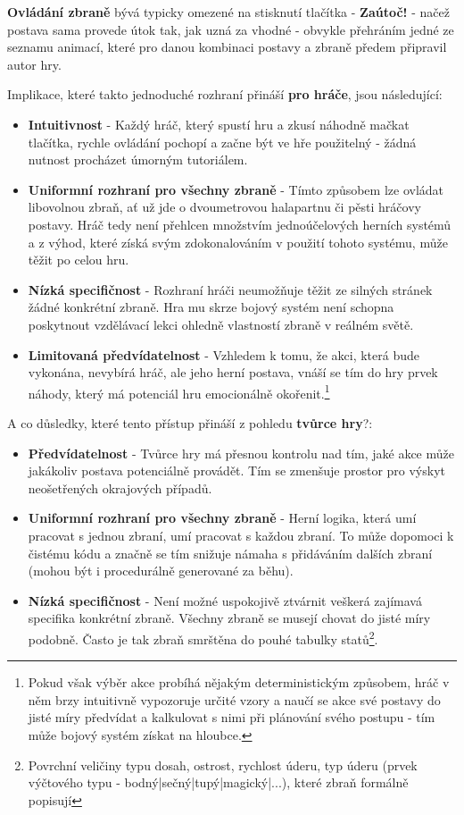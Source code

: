 \textbf{Ovládání zbraně} bývá typicky omezené na stisknutí tlačítka - \textbf{Zaútoč!} - načež postava sama provede útok tak, jak uzná za vhodné - obvykle přehráním jedné ze seznamu animací, které pro danou kombinaci postavy a zbraně předem připravil autor hry.

Implikace, které takto jednoduché rozhraní přináší \textbf{pro hráče}, jsou následující:
\begin{itemize}
    \item \textbf{Intuitivnost} - Každý hráč, který spustí hru a zkusí náhodně mačkat tlačítka, rychle ovládání pochopí a začne být ve hře použitelný - žádná nutnost procházet úmorným tutoriálem.
    \item \textbf{Uniformní rozhraní pro všechny zbraně} - Tímto způsobem lze ovládat libovolnou zbraň, ať už jde o dvoumetrovou halapartnu či pěsti hráčovy postavy. Hráč tedy není přehlcen množstvím jednoúčelových herních systémů a z výhod, které získá svým zdokonalováním v použití tohoto systému, může těžit po celou hru.
    \item \textbf{Nízká specifičnost} - Rozhraní hráči neumožňuje těžit ze silných stránek žádné konkrétní zbraně. Hra mu skrze bojový systém není schopna poskytnout vzdělávací lekci ohledně vlastností zbraně v reálném světě.
    \item \textbf{Limitovaná předvídatelnost} - Vzhledem k tomu, že akci, která bude vykonána, nevybírá hráč, ale jeho herní postava, vnáší se tím do hry prvek náhody, který má potenciál hru emocionálně okořenit.\footnote{Pokud však výběr akce probíhá nějakým deterministickým způsobem, hráč v něm brzy intuitivně vypozoruje určité vzory a naučí se akce své postavy do jisté míry předvídat a kalkulovat s nimi při plánování svého postupu - tím může bojový systém získat na hloubce.}
\end{itemize}

A co důsledky, které tento přístup přináší z pohledu \textbf{tvůrce hry}?:
\begin{itemize}
    \item \textbf{Předvídatelnost} - Tvůrce hry má přesnou kontrolu nad tím, jaké akce může jakákoliv postava potenciálně provádět. Tím se zmenšuje prostor pro výskyt neošetřených okrajových případů.
    \item \textbf{Uniformní rozhraní pro všechny zbraně} - Herní logika, která umí pracovat s jednou zbraní, umí pracovat s každou zbraní. To může dopomoci k čistému kódu a značně se tím snižuje námaha s přidáváním dalších zbraní (mohou být i procedurálně generované za běhu).
    \item \textbf{Nízká specifičnost} - Není možné uspokojivě ztvárnit veškerá zajímavá specifika konkrétní zbraně. Všechny zbraně se musejí chovat do jisté míry podobně. Často je tak zbraň smrštěna do pouhé tabulky statů\footnote{Povrchní veličiny typu dosah, ostrost, rychlost úderu, typ úderu (prvek výčtového typu - bodný|sečný|tupý|magický|...), které zbraň formálně popisují}.
\end{itemize}

